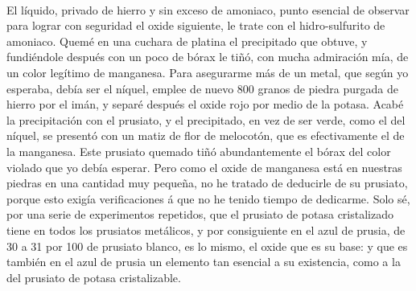 \documentclass[a4paper, 11pt, oneside, polutonikogreek, spanish]{article}
\begin{document}
\paragraph{}
El líquido, privado de hierro y sin exceso de amoniaco, punto esencial de observar para lograr con seguridad el oxide siguiente, le trate con el hidro-sulfurito de amoniaco. Quemé en una cuchara de platina el precipitado que obtuve, y fundiéndole después con un poco de bórax le tiñó, con mucha admiración mía, de un color legítimo de manganesa. Para asegurarme más de un metal, que según yo esperaba, debía ser el níquel, emplee de nuevo 800 granos de piedra purgada de hierro por el imán, y separé después el oxide rojo por medio de la potasa. Acabé la precipitación con el prusiato, y el precipitado, en vez de ser verde, como el del níquel, se presentó con un matiz de flor de melocotón, que es efectivamente el de la manganesa. Este prusiato quemado tiñó abundantemente el bórax del color violado que yo debía esperar. Pero como el oxide de manganesa está en nuestras piedras en una cantidad muy pequeña, no he tratado de deducirle de su prusiato, porque esto exigía verificaciones á que no he tenido tiempo de dedicarme. Solo sé, por una serie de experimentos repetidos, que el prusiato de potasa cristalizado tiene en todos los prusiatos metálicos, y por consiguiente en el azul de prusia, de 30 a 31 por 100 de prusiato blanco, es lo mismo, el oxide que es su base: y que es también en el azul de prusia un elemento tan esencial a su existencia, como a la del prusiato de potasa cristalizable.
\end{document}
